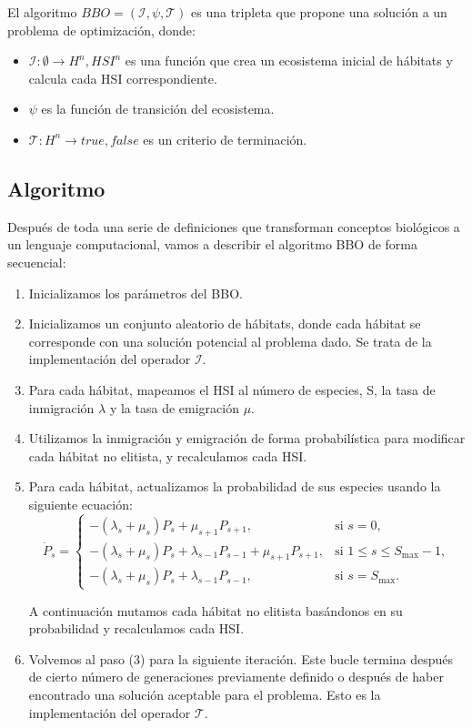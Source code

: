 \begin{mydef}
    El algoritmo $BBO = (\mathcal{I},\psi,\mathcal{T})$ es una tripleta que propone una solución a un problema de optimización, donde:
    \begin{itemize}
        \item $\mathcal{I}: \emptyset \rightarrow {H^{n},HSI^{n}}$ es una función que crea un ecosistema inicial de hábitats y calcula cada HSI correspondiente.
        \item $\psi$ es la función de transición del ecosistema.
        \item$ \mathcal{T}: H^{n} \rightarrow {true,false}$ es un criterio de terminación.
    \end{itemize}
\end{mydef}

\subsection{Algoritmo}

Después de toda una serie de definiciones que transforman conceptos biológicos a un lenguaje computacional, vamos a describir el algoritmo BBO de forma secuencial:

\begin{enumerate}
    \item Inicializamos los parámetros del BBO. 
    \item Inicializamos un conjunto aleatorio de hábitats, donde cada hábitat se corresponde con una solución potencial al problema dado.
    Se trata de la implementación del operador $\mathcal{I}$.
    \item Para cada hábitat, mapeamos el HSI al número de especies, S, la tasa de inmigración $\lambda$ y la tasa de emigración $\mu$.
    \item Utilizamos la inmigración y emigración de forma probabilística para modificar cada hábitat no elitista, y recalculamos cada HSI.
    \item Para cada hábitat, actualizamos la probabilidad de sus especies usando la siguiente ecuación: 
    \[
    \dot{P}_s =
    \begin{cases}
    -(\lambda_s + \mu_s) P_s + \mu_{s+1} P_{s+1}, & \text{si } s = 0, \\[8pt]
    -(\lambda_s + \mu_s) P_s + \lambda_{s-1} P_{s-1} + \mu_{s+1} P_{s+1}, & \text{si } 1 \le s \le S_{\max}-1, \\[8pt]
    -(\lambda_s + \mu_s) P_s + \lambda_{s-1} P_{s-1}, & \text{si } s = S_{\max}.
    \end{cases}
    \]

    A continuación mutamos cada hábitat no elitista basándonos en su probabilidad y recalculamos cada HSI.

    \item Volvemos al paso (3) para la siguiente iteración. Este bucle termina después de cierto número de generaciones previamente definido o después de haber 
    encontrado una solución aceptable para el problema. Esto es la implementación del operador $\mathcal{T}$.

\end{enumerate}



